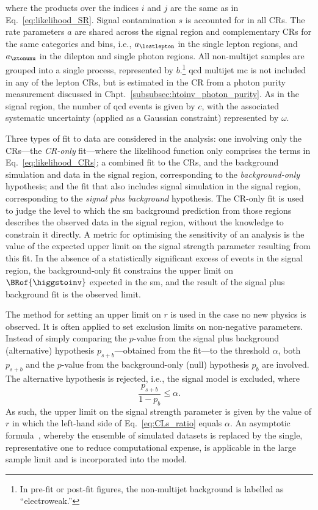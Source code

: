 where the products over the indices $i$ and $j$ are the same as in Eq.~\ref{eq:likelihood_SR}. Signal contamination $s$ is accounted for in all \glspl{CR}. The rate parameters $a$ are shared across the signal region and complementary \glspl{CR} for the same categories and \ptmiss bins, i.e., $a_{\lostlepton}$ in the single lepton regions, and $a_{\ztonunu}$ in the dilepton and single photon regions. All non-multijet samples are grouped into a single process, represented by $b$.\footnote{In pre-fit or post-fit figures, the non-multijet background is labelled as ``electroweak.''} \acrshort{qcd} multijet \acrshort{mc} is not included in any of the lepton \glspl{CR}, but is estimated in the \singlePhotonCr \gls{CR} from a photon purity measurement discussed in Chpt.~\ref{subsubsec:htoinv_photon_purity}. As in the signal region, the number of \acrshort{qcd} events is given by $c$, with the associated systematic uncertainty (applied as a Gaussian constraint) represented by $\omega$.

Three types of fit to data are considered in the analysis: one involving only the \glspl{CR}---the \emph{\gls{CR}-only} fit---where the likelihood function only comprises the terms in Eq.~\ref{eq:likelihood_CRs}; a combined fit to the \glspl{CR}, and the background simulation and data in the signal region, corresponding to the \emph{background-only} hypothesis; and the fit that also includes signal simulation in the signal region, corresponding to the \emph{signal plus background} hypothesis. The \gls{CR}-only fit is used to judge the level to which the \acrshort{sm} background prediction from those regions describes the observed data in the signal region, without the knowledge to constrain it directly. A metric for optimising the sensitivity of an analysis is the value of the expected upper limit on the signal strength parameter resulting from this fit. In the absence of a statistically significant excess of events in the signal region, the background-only fit constrains the upper limit on $\BRof{\higgstoinv}$ expected in the \acrshort{sm}, and the result of the signal plus background fit is the observed limit.

The \CLs method for setting an upper limit on $r$ is used in the case no new physics is observed. It is often applied to set exclusion limits on non-negative parameters. Instead of simply comparing the $p$-value from the signal plus background (alternative) hypothesis $p_{s+b}$---obtained from the fit---to the threshold $\alpha$, both $p_{s+b}$ and the $p$-value from the background-only (null) hypothesis $p_b$ are involved. The alternative hypothesis is rejected, i.e., the signal model is excluded, where
\begin{equation}
    \frac{p_{s+b}}{1 - p_b} \leq \alpha.
    \label{eq:CLs_ratio}
\end{equation}
As such, the upper limit on the signal strength parameter is given by the value of $r$ in which the left-hand side of Eq.~\ref{eq:CLs_ratio} equals $\alpha$. An asymptotic formula~\cite{Cowan:2010js}, whereby the ensemble of simulated datasets is replaced by the single, representative one to reduce computational expense, is applicable in the large sample limit and is incorporated into the model.

